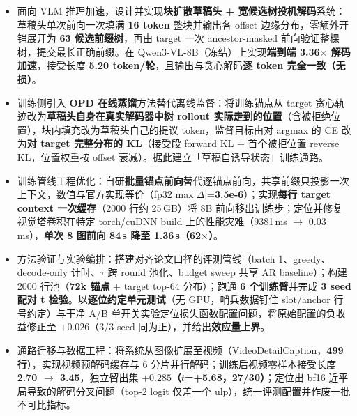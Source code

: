 

\begin{itemize}[parsep=0.5ex]
    \item 面向 VLM 推理加速，设计并实现\textbf{块扩散草稿头 + 宽候选树投机解码}系统：草稿头单次前向一次填满 \textbf{16 token} 整块并输出各 offset 边缘分布，零额外开销展开为 \textbf{63 候选前缀树}，再由 target 一次 ancestor-masked 前向验证整棵树，提交最长正确前缀。在 Qwen3-VL-8B（冻结）上实现\textbf{端到端 \textbf{3.36$\times$} 解码加速}，接受长度 \textbf{5.20 token/轮}，且输出与贪心解码\textbf{逐 token 完全一致（无损）}。

    \item 训练侧引入 \textbf{OPD 在线蒸馏}方法替代离线监督：将训练锚点从 target 贪心轨迹改为\textbf{草稿头自身在真实解码器中树 rollout 实际走到的位置}（含被拒绝位置），块内填充改为草稿头自己的提议 token，监督目标由对 argmax 的 CE 改为\textbf{对 target 完整分布的 KL}（接受段 forward KL + 首个被拒位置 reverse KL，位置权重按 offset 衰减）。据此建立「草稿自诱导状态」训练通路。

    \item 训练管线工程优化：自研\textbf{批量锚点前向}替代逐锚点前向，共享前缀只投影一次上下文，数值与官方实现等价（fp32 max$|\Delta|$=\textbf{3.5e-6}）；实现\textbf{每行 target context 一次缓存}（2000 行约 25\,GB）将 8B 前向移出训练步；定位并修复视觉塔卷积在特定 torch/cuDNN build 上的性能灾难（9381\,ms $\rightarrow$ 0.03\,ms），\textbf{单次 8 图前向 84\,s 降至 1.36\,s（62$\times$）}。

    \item 方法验证与实验编排：搭建对齐论文口径的评测管线（batch 1、greedy、decode-only 计时、$\tau$ 跨 round 池化、budget sweep 共享 AR baseline）；构建 2000 行池（\textbf{72k 锚点} + target top-64 分布）；跑通 \textbf{6 个训练臂}并完成 \textbf{3 seed 配对 t 检验}。以\textbf{逐位约定单元测试}（无 GPU，哨兵数据钉住 slot/anchor 行号约定）与干净 A/B 单开关实验定位损失函数配置问题，将原始配置的负收益修正至 $+0.026$（3/3 seed 同为正），并给出\textbf{效应量上界}。

    \item 通路迁移与数据工程：将系统从图像扩展至视频（VideoDetailCaption，\textbf{499 行}），实现视频预解码缓存与 6 分片并行解码；训练后视频零样本接受长度 \textbf{2.70 $\rightarrow$ 3.45}，独立留出集 \textbf{$+0.285$（$t$=+5.68，27/30）}；定位出 bf16 近平局导致的解码分叉问题（top-2 logit 仅差一个 ulp），统一评测配置并作废一批不可比指标。
\end{itemize}
